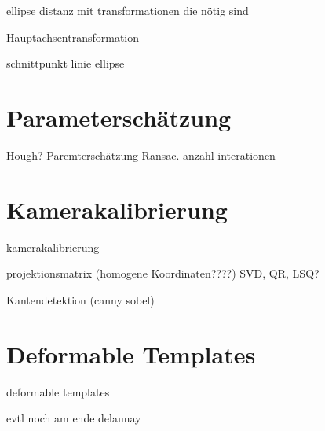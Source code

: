 \newpage
ellipse distanz mit transformationen die nötig sind

Hauptachsentransformation

schnittpunkt linie ellipse


\section{Parameterschätzung}

Hough?
Paremterschätzung Ransac. anzahl interationen




\section{Kamerakalibrierung}

kamerakalibrierung

projektionsmatrix
(homogene Koordinaten????)
SVD, QR, LSQ?



Kantendetektion (canny sobel)

\section{Deformable Templates}


deformable templates

evtl noch am ende delaunay